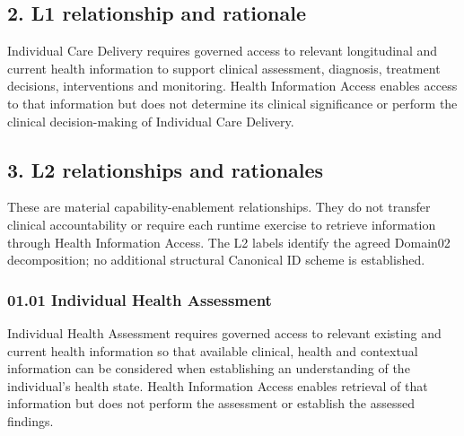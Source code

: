 \label{rad:b2-1:23}
\subsection*{2. L1 relationship and rationale}
\label{rad:b2-1:25}

\texttt{}

\label{rad:b2-1:27}

Individual Care Delivery requires governed access to relevant longitudinal and current health information to support clinical assessment, diagnosis, treatment decisions, interventions and monitoring. Health Information Access enables access to that information but does not determine its clinical significance or perform the clinical decision-making of Individual Care Delivery.

\label{rad:b2-1:33}
\subsection*{3. L2 relationships and rationales}
\label{rad:b2-1:35}

These are material capability-enablement relationships. They do not transfer clinical accountability or require each runtime exercise to retrieve information through Health Information Access. The L2 labels identify the agreed Domain02 decomposition; no additional structural Canonical ID scheme is established.

\label{rad:b2-1:40}
\subsubsection*{01.01 Individual Health Assessment}
\label{rad:b2-1:42}

\texttt{}

\label{rad:b2-1:44}

Individual Health Assessment requires governed access to relevant existing and current health information so that available clinical, health and contextual information can be considered when establishing an understanding of the individual's health state. Health Information Access enables retrieval of that information but does not perform the assessment or establish the assessed findings.

\label{rad:b2-1:50}

